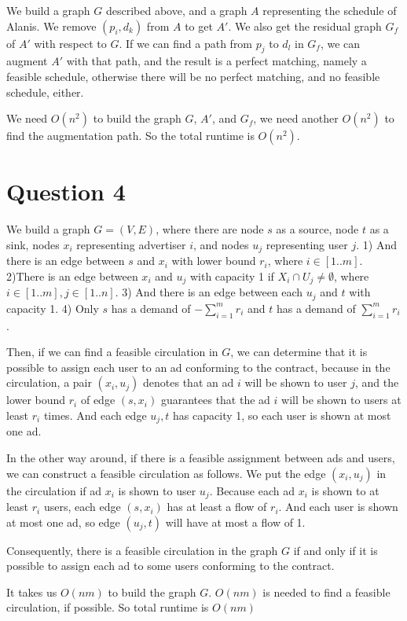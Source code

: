 \documentclass[letter,12pt]{article}
\begin{document}
 We build a graph $G$ described above, and a graph $A$ representing the 
 schedule of Alanis. We remove $(p_i, d_k)$ from $A$ to get $A'$. We also get 
 the residual graph $G_f$ of $A'$ with respect to $G$. If we can find a path
 from $p_j$ to $d_l$ in $G_f$, we can augment $A'$ with that path, and the 
 result is a perfect matching, namely a feasible schedule, otherwise there will be 
 no perfect matching, and no feasible schedule, either.
 
 We need $O(n^2)$ to build the graph $G$, $A'$, and $G_f$, we need another
 $O(n^2)$ to find the augmentation path. So the total runtime is $O(n^2)$.
 
 
\section*{Question 4}
We build a graph $G=(V, E)$, where there are node $s$ as a source, node $t$ as
a sink, nodes $x_i$ representing advertiser $i$, and nodes $u_j$ representing
user $j$. 1) And there is an edge between $s$ and $x_i$ with lower bound $r_i$, 
where $i \in [1..m]$.  2)There is an edge between $x_i$ and $u_j$ with capacity 
1 if $X_i \cap U_j \neq \emptyset$, where $i \in [1..m], j \in [1..n]$. 3) And there 
is an edge between each $u_j$ and $t$ with capacity 1. 4) Only $s$ has a 
demand of $- \sum\limits_{i=1}^m r_i$ and $t$ has a demand of 
$\sum\limits_{i=1}^m r_i$.

Then, if we can find a feasible circulation in $G$, we can determine that it is 
possible to assign each user to an ad conforming to the contract, because in 
the circulation, a pair $(x_i, u_j)$ denotes that an ad $i$ will be shown to user
$j$, and the lower bound $r_i$ of edge $(s, x_i)$ guarantees that the ad $i$ will 
be shown to users at least $r_i$ times. And each edge $u_j, t$ has capacity 1,
so each user is shown at most one ad.

In the other way around, if there is a feasible assignment between ads and users,
we can construct a feasible circulation as follows. We put the edge $(x_i, u_j)$
in the circulation if ad $x_i$ is shown to user $u_j$. Because each ad $x_i$ is 
shown to at least $r_i$ users, each edge $(s, x_i)$ has at least a flow of $r_i$. 
And each user is shown at most one ad, so edge $(u_j, t)$ will have at most a 
flow of 1.

Consequently, there is a feasible circulation in the graph $G$ if and only if it is
possible to assign each ad to some users conforming to the contract.

It takes us $O(nm)$ to build the graph $G$. $O(nm)$ is needed to find a feasible
circulation, if possible. So total runtime is $O(nm)$
\end{document}

